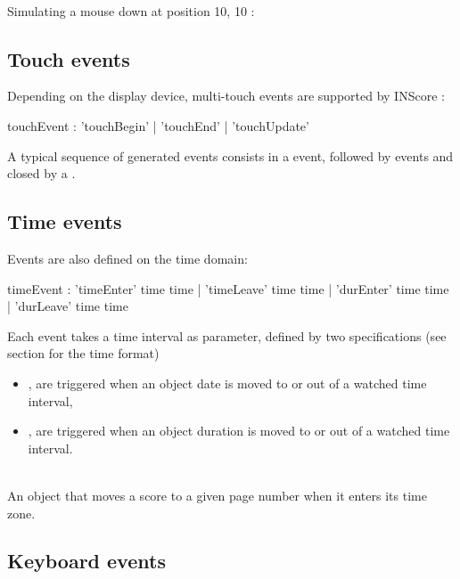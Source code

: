 \documentclass[a4paper,twoside]{report}
\newcommand{\subsublevel}[1]	{\subsection{#1}}
\begin{document}
\example \\
Simulating a mouse down at position 10, 10 :

\subsublevel{Touch events}
\label{touchevents}
Depending on the display device, multi-touch events are supported by INScore :


\begin{rail}
touchEvent : 'touchBegin' | 'touchEnd' | 'touchUpdate' 
\end{rail}

A typical sequence of generated events consists in a  event, followed by  events and closed by a .

\subsublevel{Time events}
\label{timeevents}

Events are also defined on the time domain:


\begin{rail}
timeEvent : 	'timeEnter' time time | 'timeLeave' time time 
		| 'durEnter' time time | 'durLeave' time time 
\end{rail}

Each event takes a time interval as parameter, defined by two  specifications (see section  for the time format)

\begin{itemize}
\item {},  are triggered when an object date is moved to or out of a watched time interval,
\item {},  are triggered when an object duration is moved to or out of a watched time interval.
\end{itemize}

\example \\
An object that moves a score to a given page number when it enters its time zone.

\subsublevel{Keyboard events}
\label{keyevents}
\end{document}
